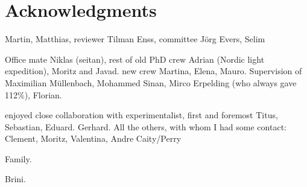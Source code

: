 
\bigskip

\begingroup
\let\clearpage\relax
\let\cleardoublepage\relax
\let\cleardoublepage\relax
\chapter*{Acknowledgments}
Martin, Matthias, reviewer Tilman Enss, committee Jörg Evers, Selim

Office mate Niklas (seitan), rest of old PhD crew Adrian (Nordic light expedition), Moritz and Javad. new crew Martina, Elena, Mauro. Supervision of Maximilian Müllenbach, Mohammed Sinan, Mirco Erpelding (who always gave 112\%), Florian.

enjoyed close collaboration with experimentalist, first and foremost Titus, Sebastian, Eduard. Gerhard. All the others, with whom I had some contact: Clement, Moritz, Valentina, Andre
Caity/Perry

Family. 

Brini.
\endgroup
